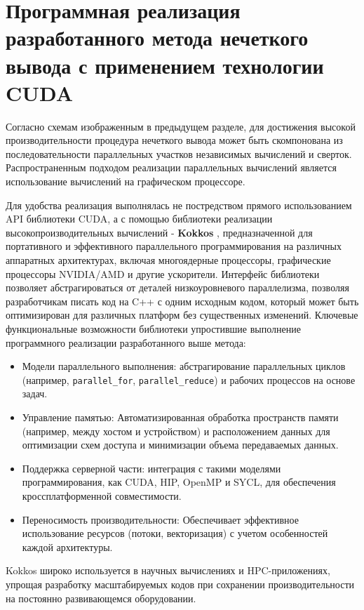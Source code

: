 \chapter{Программная реализация разработанного метода нечеткого вывода с применением технологии CUDA}\label{ch:ch3}

Согласно схемам \cite{} изображенным в предыдущем разделе, для достижения высокой производительности процедура нечеткого вывода может быть скомпонована из последовательности параллельных участков независимых вычислений и сверток. Распространенным подходом реализации параллельных вычислений является использование вычислений на графическом процессоре.

Для удобства реализация выполнялась не постредством прямого использованием API библиотеки CUDA, а с помощью библиотеки реализации высокопроизводительных вычислений - \textbf{Kokkos} \cite{KokkosWiki, KokkosCarterEdwards20143202}, предназначенной для портативного и эффективного параллельного программирования на различных аппаратных архитектурах, включая многоядерные процессоры, графические процессоры NVIDIA/AMD и другие ускорители. Интерфейс библиотеки позволяет абстрагироваться от деталей низкоуровневого параллелизма, позволяя разработчикам писать код на C++ с одним исходным кодом, который может быть оптимизирован для различных платформ без существенных изменений. 
Ключевые функциональные возможности библиотеки упростившие выполнение программного реализации разработанного выше метода:
\begin{itemize}
\item Модели параллельного выполнения: абстрагирование параллельных циклов (например, \lstinline|parallel_for|, \lstinline|parallel_reduce|) и рабочих процессов на основе задач.  
\item Управление памятью: Автоматизированная обработка пространств памяти (например, между хостом и устройством) и расположением данных для оптимизации схем доступа и минимизации объема передаваемых данных.  
\item Поддержка серверной части: интеграция с такими моделями программирования, как CUDA, HIP, OpenMP и SYCL, для обеспечения кроссплатформенной совместимости.  
\item Переносимость производительности: Обеспечивает эффективное использование ресурсов (потоки, векторизация) с учетом особенностей каждой архитектуры.
\end{itemize}

Kokkos широко используется в научных вычислениях и HPC-приложениях, упрощая разработку масштабируемых кодов при сохранении производительности на постоянно развивающемся оборудовании. 

